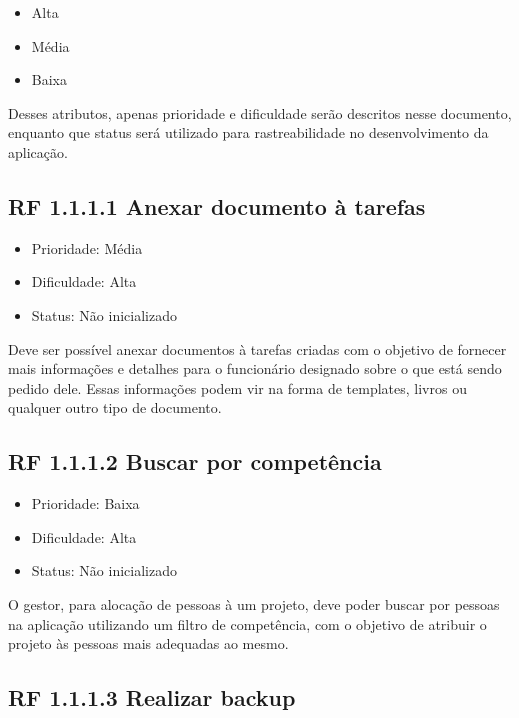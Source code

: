 \begin{apendicesenv}
\begin{itemize}
{  \begin{itemize}
    \item{Alta}
    \item{Média}
    \item{Baixa}
  \end{itemize}
}
\end{itemize}

Desses atributos, apenas prioridade e dificuldade serão descritos nesse documento, enquanto que status será utilizado para rastreabilidade no desenvolvimento da aplicação.


\subsection{RF 1.1.1.1  Anexar documento à tarefas}

\begin{itemize}
  \item{Prioridade: Média}
  \item{Dificuldade: Alta}
  \item{Status: Não inicializado}
\end{itemize}

Deve ser possível anexar documentos à tarefas criadas com o objetivo de fornecer mais informações e detalhes para o funcionário designado sobre o que está sendo pedido dele. Essas informações podem vir na forma de templates, livros ou qualquer outro tipo de documento.


\subsection{RF 1.1.1.2 Buscar por competência}

\begin{itemize}
  \item{Prioridade: Baixa}
  \item{Dificuldade: Alta}
  \item{Status: Não inicializado}
\end{itemize}

O gestor, para alocação de pessoas à um projeto, deve poder buscar por pessoas na aplicação utilizando um filtro de competência, com o objetivo de atribuir o projeto às pessoas mais adequadas ao mesmo.


\subsection{RF 1.1.1.3 Realizar backup}


\end{apendicesenv}
